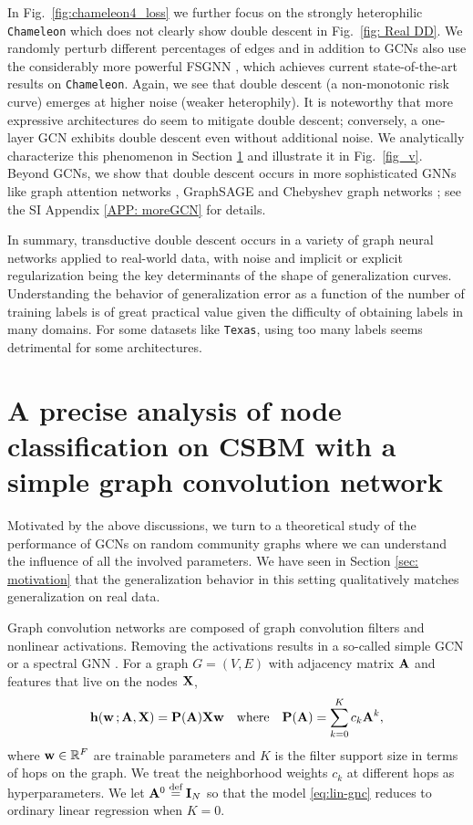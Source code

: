 \documentclass[9pt,twocolumn]{pnas-new}
\begin{document}
In Fig.~\ref{fig:chameleon4_loss} we further focus on the strongly heterophilic \texttt{Chameleon} which does not clearly show double descent in Fig.~\ref{fig: Real DD}. We randomly perturb different percentages of edges and in addition to GCNs also use the considerably more powerful FSGNN \cite{maurya2021improving}, which achieves current state-of-the-art results on \texttt{Chameleon}. Again, we see that double descent (a non-monotonic risk curve) emerges at higher noise (weaker heterophily). It is noteworthy that more expressive architectures do seem to mitigate double descent; conversely, a one-layer GCN exhibits double descent even without additional noise. We analytically characterize this phenomenon in Section \ref{sec: precise analysis} and illustrate it in Fig.~\ref{fig_v}. Beyond GCNs, we show that double descent occurs in more sophisticated GNNs like graph attention networks \cite{velivckovic2017graph}, GraphSAGE \cite{hamilton2017inductive} and Chebyshev graph networks \cite{defferrard2016convolutional}; see the SI Appendix \ref{APP: moreGCN} for details. 

In summary, transductive double descent occurs in a variety of graph neural networks applied to real-world data, with noise and implicit or explicit regularization being the key determinants of the shape of generalization curves. Understanding the behavior of generalization error as a function of the number of training labels is of great practical value given the difficulty of obtaining labels in many domains. For some datasets like \texttt{Texas}, using too many labels seems detrimental for some architectures. 

\section{A precise analysis of node classification on CSBM with a simple graph convolution network}\label{sec: precise analysis}

Motivated by the above discussions, we turn to a theoretical study of the performance of GCNs on random community graphs where we can understand the influence of all the involved parameters. We have seen in Section \ref{sec: motivation} that the generalization behavior in this setting qualitatively matches generalization on real data.

Graph convolution networks are composed of graph convolution filters and nonlinear activations. Removing the activations results in a so-called simple GCN \cite{wu2019simplifying} or a spectral GNN \cite{wang2022powerful,he2021bernnet}. For a graph $G = (V, E)$ with adjacency matrix $\mathbf{A}$ and features that live on the nodes $\mathbf{X}$,
\begin{equation}
    \label{eq:lin-gnc}
    \mathbf{h}(\mathbf{w} \mathop{;} \mathbf{A},\mathbf{X})=\mathbf{P}(\mathbf{A}) \mathbf{X} \mathbf{w} \quad \text{where} \quad \mathbf{P}(\mathbf{A})=\sum_{k=0}^K c_k \mathbf{A}^k,
\end{equation}
where $\mathbf{w} \in \mathbb{R}^F$ are trainable parameters and $K$ is the filter support size in terms of hops on the graph. We treat the neighborhood weights $c_k$ at different hops as hyperparameters. We let $\mathbf{A}^0 \overset{\text{def}}{=} \mathbf{I}_N$ so that the model \eqref{eq:lin-gnc} reduces to ordinary linear regression when $K=0$. 
\end{document}
